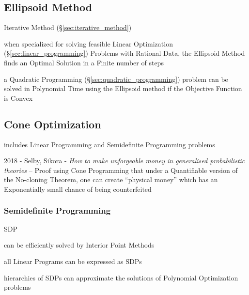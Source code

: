 \subsection{Ellipsoid Method}\label{sec:ellipsoid_method}

Iterative Method (\S\ref{sec:iterative_method})

when specialized for solving feasible Linear Optimization
(\S\ref{sec:linear_programming}) Problems with Rational Data, the Ellipsoid
Method finds an Optimal Solution in a Finite number of steps

a Quadratic Programming (\S\ref{sec:quadratic_programming}) problem can be
solved in Polynomial Time using the Ellipsoid method if the Objective Function
is Convex



\subsection{Cone Optimization}\label{sec:cone_optimization}

includes Linear Programming and Semidefinite Programming problems

2018 - Selby, Sikora - \emph{How to make unforgeable money in generalised
  probabilistic theories} -- Proof using Cone Programming that under a
Quantifiable version of the No-cloning Theorem, one can create ``physical
money'' which has an Exponentially small chance of being counterfeited



\subsubsection{Semidefinite Programming}\label{sec:semidefinite_programming}

SDP

can be efficiently solved by Interior Point Methods

all Linear Programs can be expressed as SDPs

hierarchies of SDPs can approximate the solutions of Polynomial Optimization
problems



